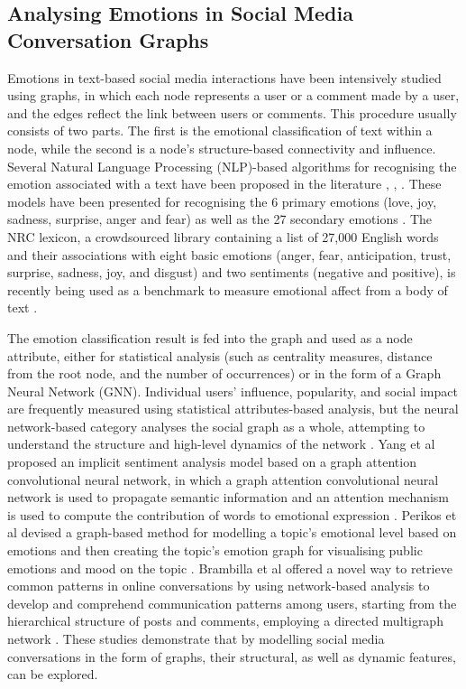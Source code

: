 \documentclass[acmtog]{acmart}
\begin{document}
\subsection{Analysing Emotions in Social Media Conversation Graphs}
Emotions in text-based social media interactions have been intensively studied using graphs, in which each node represents a user or a comment made by a user, and the edges reflect the link between users or comments. This procedure usually consists of two parts. The first is the emotional classification of text within a node, while the second is a node's structure-based connectivity and influence. Several Natural Language Processing (NLP)-based algorithms for recognising the emotion associated with a text have been proposed in the literature \cite{poria2019emotion}, \cite{chowanda2021exploring}, \cite{majumder2019dialoguernn}. These models have been presented for recognising the 6 primary emotions (love, joy, sadness, surprise, anger and fear) as well as the 27 secondary emotions \cite{shaver1987emotion}. The NRC lexicon, a crowdsourced library containing a list of 27,000 English words and their associations with eight basic emotions (anger, fear, anticipation, trust, surprise, sadness, joy, and disgust) and two sentiments (negative and positive), is recently being used as a benchmark to measure emotional affect from a body of text \cite{mohammad2013crowdsourcing}.

The emotion classification result is fed into the graph and used as a node attribute, either for statistical analysis (such as centrality measures, distance from the root node, and the number of occurrences) or in the form of a Graph Neural Network (GNN). Individual users' influence, popularity, and social impact are frequently measured using statistical attributes-based analysis, but the neural network-based category analyses the social graph as a whole, attempting to understand the structure and high-level dynamics of the network \cite{antonakaki2021survey}. Yang et al proposed an implicit sentiment analysis model based on a graph attention convolutional neural network, in which a graph attention convolutional neural network is used to propagate semantic information and an attention mechanism is used to compute the contribution of words to emotional expression \cite{yang2022implicit}. Perikos et al devised a graph-based method for modelling a topic's emotional level based on emotions and then creating the topic's emotion graph for visualising public emotions and mood on the topic \cite{perikos2018framework}. Brambilla et al offered a novel way to retrieve common patterns in online conversations by using network-based analysis to develop and comprehend communication patterns among users, starting from the hierarchical structure of posts and comments, employing a directed multigraph network \cite{brambilla2021conversation}. These studies demonstrate that by modelling social media conversations in the form of graphs, their structural, as well as dynamic features, can be explored.
\end{document}
